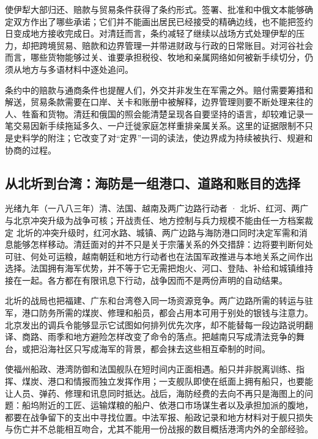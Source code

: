 使伊犁大部归还、赔款与贸易条件获得了条约形式。签署、批准和中俄文本能够确定双方作出了哪些承诺；它们并不能画出居民已经接受的精确边线，也不能把签约日变成地方接收完成日。对清廷而言，条约减轻了继续以战场方式处理伊犁的压力，却把跨境贸易、赔款和边界管理一并带进财政与行政的日常账目。对河谷社会而言，哪些货物能够过关、谁要承担税役、牧地和亲属网络如何被新手续切分，仍须从地方与多语材料中逐处追问。

条约中的赔款与通商条件也提醒人们，外交并非发生在军需之外。赔付需要筹措和解送，贸易条款需要在口岸、关卡和账册中被解释，边界管理则要不断处理来往的人、牲畜和货物。清廷和俄国的照会能清楚呈现各自要坚持的语言，却较难记录一笔交易因新手续拖延多久、一户迁徙家庭怎样重排亲属关系。这里的证据限制不只是史料学的附注；它改变了对“定界”一词的读法，使边界成为持续被执行、规避和协商的过程。

\subsection{从北圻到台湾：海防是一组港口、道路和账目的选择}

\begin{event}{}{光绪九年（一八八三年）}{清、法国、越南及两广边路行动者 · 北圻、红河、两广与北京}{冲突升级为战争可核；开战责任、地方控制与兵力规模不能由任一方档案裁定}
北圻的冲突升级时，红河水路、城镇、两广边路与海防港口同时决定军需和消息能够怎样移动。清廷面对的并不只是关于宗藩关系的外交措辞：边将要判断何处可驻、何处可运粮，越南朝廷和地方行动者也在法国军政推进与本地关系之间作出选择。法国拥有海军优势，并不等于它无需把炮火、河口、登陆、补给和城镇维持接在一起。各方都在有限讯息下行动，战争因而不是两份声明的自动结果。

北圻的战局也把福建、广东和台湾卷入同一场资源竞争。两广边路所需的转运与驻军，港口防务所需的煤炭、修理和船员，都会占用本可用于别处的银钱与注意力。北京发出的调兵令能够显示它试图如何排列优先次序，却不能替每一段边路说明翻译、商路、雨季和地方避险怎样改变了命令的落点。把越南只写成清法竞争的舞台，或把沿海社区只写成海军的背景，都会抹去这些相互牵制的时间。
\end{event}

使福州船政、港湾防御和法国舰队在短时间内正面相遇。船只并非脱离训练、指挥、煤炭、港口和情报而独立发挥作用；一支舰队即使在纸面上拥有船只，也要能让人员、弹药、修理和讯息同时抵达。战后，海防经费的去向不再只是海图上的问题：船坞附近的工匠、运输煤粮的船户、依港口市场谋生者以及承担加派的腹地，都要在战争留下的支出中寻找位置。中法军报、船政记录和地方材料对于舰只损失与伤亡并不总能相互吻合，尤其不能用一份战报的数目概括港湾内外的全部经验。

